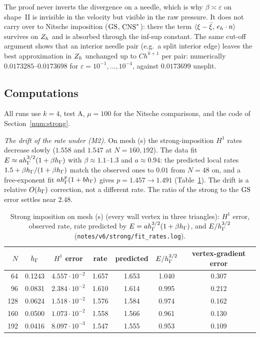 The proof never inverts the divergence on a needle, which is why $\beta\asymp\varepsilon$ on shape~II is invisible in the velocity but visible in the raw pressure. It does not carry over to Nitsche imposition ($\mathrm{GS}$, $\mathrm{CNS}^\ast$): there the term $\langle \xi-\bar\xi,\, e_h\cdot n\rangle$ survives on $Z_h$ and is absorbed through the inf-sup constant. The same cut-off argument shows that an interior needle pair (e.g.\ a split interior edge) leaves the best approximation in $Z_h$ unchanged up to $Ch^{k+1}$ per pair: numerically $0.0173285$--$0.0173698$ for $\varepsilon=10^{-1},\dots,10^{-4}$, against $0.0173699$ unsplit.

\subsection{Computations}\label{st:sec:num}

All runs use $k=4$, test A, $\mu=100$ for the Nitsche comparisons, and the code of Section~\ref{num:strong}.

\emph{The drift of the rate under (M2).} On mesh (s) the strong-imposition $H^1$ rates decrease slowly ($1.558$ and $1.547$ at $N=160,192$). The data fit $E\approx ah_\Gamma^{3/2}(1+\beta h_\Gamma)$ with $\beta\approx1.1$--$1.3$ and $a\approx0.94$: the predicted local rates $1.5+\beta h_\Gamma/(1+\beta h_\Gamma)$ match the observed ones to $0.01$ from $N=48$ on, and a free-exponent fit $ah_\Gamma^p(1+bh_\Gamma)$ gives $p=1.457\to1.491$ (Table~\ref{st:tab:drift}). The drift is a relative $O(h_\Gamma)$ correction, not a different rate. The ratio of the strong to the $\mathrm{GS}$ error settles near $2.48$.

\begin{table}[t]
\centering\small
\caption{Strong imposition on mesh (s) (every wall vertex in three triangles): $H^1$ error, observed rate, rate predicted by $E=ah_\Gamma^{3/2}(1+\beta h_\Gamma)$, and $E/h_\Gamma^{3/2}$ (\texttt{notes/v6/strong/fit\_rates.log}).}\label{st:tab:drift}
\begin{tabular}{rcccccc}
\toprule
$N$ & $h_\Gamma$ & $H^1$ error & rate & predicted & $E/h_\Gamma^{3/2}$ & vertex-gradient error\\
\midrule
64 & 0.1243 & $4.557\cdot10^{-2}$ & 1.657 & 1.653 & 1.040 & 0.307\\
96 & 0.0831 & $2.384\cdot10^{-2}$ & 1.610 & 1.614 & 0.995 & 0.212\\
128 & 0.0624 & $1.518\cdot10^{-2}$ & 1.576 & 1.584 & 0.974 & 0.162\\
160 & 0.0500 & $1.073\cdot10^{-2}$ & 1.558 & 1.566 & 0.961 & 0.130\\
192 & 0.0416 & $8.097\cdot10^{-3}$ & 1.547 & 1.555 & 0.953 & 0.109\\
\bottomrule
\end{tabular}
\end{table}

